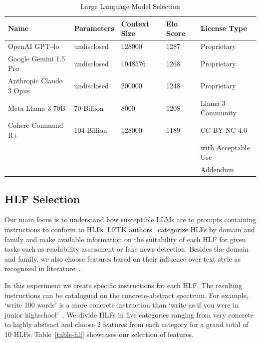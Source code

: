 \documentclass[runningheads,a4paper,11pt]{article}
\begin{document}
\begin{table}[ht]
    \setlength\tabcolsep{6pt}
    \centering
    \begin{tabular}{@{}lllll@{}}
        \toprule
        Name                    & Parameters  & Context Size & Elo Score & License Type        \\ \toprule
        OpenAI GPT-4o           & undisclosed & 128000       & 1287      & Proprietary         \\
        Google Gemini 1.5 Pro   & undisclosed & 1048576      & 1268      & Proprietary         \\
        Anthropic Claude 3 Opus & undisclosed & 200000       & 1248      & Proprietary         \\
        Meta Llama 3-70B        & 70 Billion  & 8000         & 1208      & Llama 3 Community   \\
        Cohere Command R+       & 104 Billion & 128000       & 1189      & CC-BY-NC 4.0        \\
                                &             &              &           & with Acceptable Use \\
                                &             &              &           & Addendum            \\ \bottomrule
    \end{tabular}
    \caption{Large Language Model Selection}\label{table-llm}
\end{table}

\subsection{HLF Selection}\label{hlf-selection}

Our main focus is to understand how susceptible LLMs are to prompts containing
instructions to conform to HLFs.
LFTK authors~\cite{lftk-2023} categorize HLFs by domain and family and make
available information on the suitability of each HLF for given tasks such as
readability assessment or fake news detection.
Besides the domain and family, we also choose features based on their influence
over text style as recognized in literature~\cite{verma2019lexical,lugea2023stylistics}.

In this experiment we create specific instructions for each HLF.
The resulting instructions can be catalogued on the concrete-abstract spectrum.
For example, `write 100 words' is a more concrete instruction than `write as if
you were in junior highschool'~\cite{kincaid1975derivation}.
We divide HLFs in five categories ranging from very concrete to highly abstract
and choose 2 features from each category for a grand total of 10 HLFs.
Table~\ref{table-hlf} showcases our selection of features.
\end{document}

